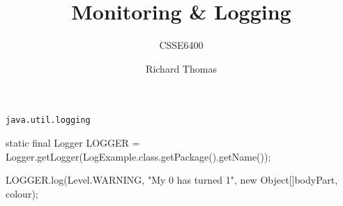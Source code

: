 \documentclass{slide}
\title{Monitoring \& Logging}
\subtitle{CSSE6400}
\author{Richard Thomas}
\date{\week{9}}
\begin{document}
\maketitle


\begin{frame}{\texttt{java.util.logging}}
\begin{code}[language=java]
static final Logger LOGGER = Logger.getLogger(LogExample.class.getPackage().getName());

LOGGER.log(Level.WARNING, "My {0} has turned {1}", new Object[]{bodyPart, colour});
\end{code}
\end{frame}

\end{document}
